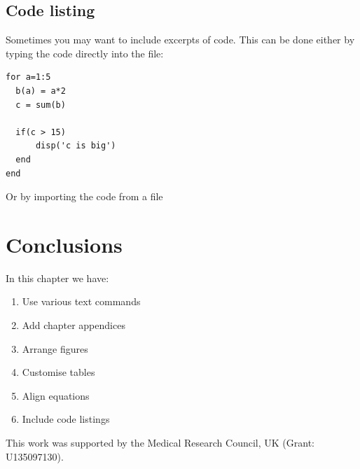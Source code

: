\subsection{Code listing}

Sometimes you may want to include excerpts of code. This can be done either by typing the code directly into the file:

\begin{lstlisting}
for a=1:5
  b(a) = a*2
  c = sum(b)

  if(c > 15)
	  disp('c is big')
  end
end
\end{lstlisting}

Or by importing the code from a file



\section{Conclusions}
In this chapter we have:
\begin{enumerate}[(1)]
\item Use various text commands
\item Add chapter appendices
\item Arrange figures
\item Customise tables
\item Align equations
\item Include code listings
\end{enumerate}


\theendnotes


\begin{chapacknowledgements}
This work was supported by the Medical Research Council, UK (Grant: U135097130).
\end{chapacknowledgements}


